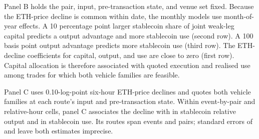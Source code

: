 Panel B holds the pair, input, pre-transaction state, and venue set fixed. Because the ETH-price decline is common within date, the monthly models use month-of-year effects. A 10 percentage point larger stablecoin share of joint weak-leg capital predicts a \EthStressDepthOutputEffect{} output advantage and \EthStressDepthChoiceEffect{} more stablecoin use (second row). A 100 basis point output advantage predicts \EthStressOutputChoiceEffect{} more stablecoin use (third row). The ETH-decline coefficients for capital, output, and use are close to zero (first row). Capital allocation is therefore associated with quoted execution and realised use among trades for which both vehicle families are feasible.

Panel C uses 0.10-log-point six-hour ETH-price declines and quotes both vehicle families at each route's input and pre-transaction state. Within event-by-pair and relative-hour cells, panel C associates the decline with \EthStressIntradayOutputEffect{} in stablecoin relative output and \EthStressIntradayChoiceEffect{} in stablecoin use. Its \EthStressIntradayN{} routes span \EthStressIntradayEvents{} events and \EthStressIntradayPairs{} pairs; standard errors of \EthStressIntradayOutputSE{} and \EthStressIntradayChoiceSE{} leave both estimates imprecise.

